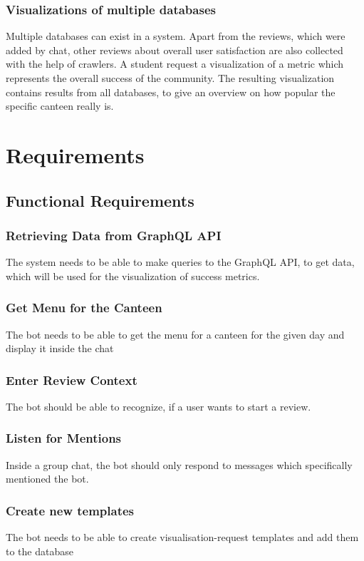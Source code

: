 \subsubsection{Visualizations of multiple databases} Multiple databases can exist in a system. Apart from the reviews, which were added by chat, other reviews about overall user satisfaction are also collected with the help of crawlers. A student request a visualization of a metric which represents the overall success of the community. The resulting visualization contains results from all databases, to give an overview on how popular the specific canteen really is.

\section{Requirements}

\subsection{Functional Requirements}

\subsubsection{Retrieving Data from GraphQL API}
The system needs to be able to make queries to the GraphQL API, to get data, which will be used for the visualization of success metrics.

\subsubsection{Get Menu for the Canteen} The bot needs to be able to get the menu for a canteen for the given day and display it inside the chat

\subsubsection{Enter Review Context} The bot should be able to recognize, if a user wants to start a review.

\subsubsection{Listen for Mentions} Inside a group chat, the bot should only respond to messages which specifically mentioned the bot.

\subsubsection{Create new templates} The bot needs to be able to create visualisation-request templates and add them to the database


